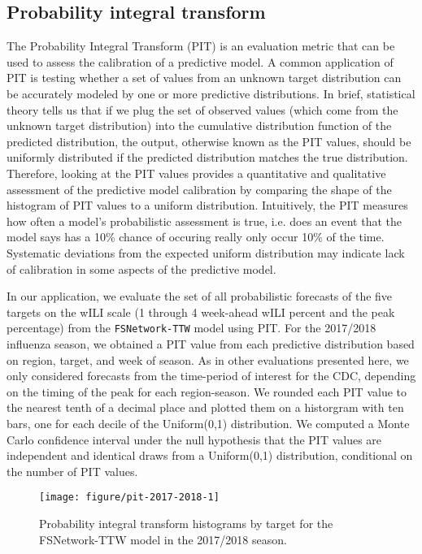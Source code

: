 \documentclass{article}\usepackage[]{graphicx}\usepackage[]{color}
\makeatletter
\def\maxwidth{ %
  \ifdim\Gin@nat@width>\linewidth
    \linewidth
  \else
    \Gin@nat@width
  \fi
}
\newenvironment{knitrout}{}{} %
\makeatother
\begin{document}
\subsection{Probability integral transform}

The Probability Integral Transform (PIT) is an evaluation metric that can be used to assess the calibration of a predictive model.
A common application of PIT is testing whether a set of values from an unknown target distribution can be accurately modeled by one or more predictive distributions. 
In brief, statistical theory tells us that if we plug the set of observed values (which come from the unknown target distribution) into the cumulative distribution function of the predicted distribution, the output, otherwise known as the PIT values, should be uniformly distributed if the predicted distribution matches the true distribution.\cite{angus1994probability,diebold1997evaluating}
Therefore, looking at the PIT values provides a quantitative and qualitative assessment of the predictive model calibration by comparing the shape of the histogram of PIT values to a uniform distribution. 
Intuitively, the PIT measures how often a model's probabilistic assessment is true, i.e. does an event that the model says has a 10\% chance of occuring really only occur 10\% of the time.
Systematic deviations from the expected uniform distribution may indicate lack of calibration in some aspects of the predictive model.

In our application, we evaluate the set of all probabilistic forecasts of the five targets on the wILI scale (1 through 4 week-ahead wILI percent and the peak percentage) from the {\tt FSNetwork-TTW} model using PIT. For the 2017/2018 influenza season, we obtained a PIT value from each predictive distribution based on region, target, and week of season. 
As in other evaluations presented here, we only considered forecasts from the time-period of interest for the CDC, depending on the timing of the peak for each region-season.
We rounded each PIT value to the nearest tenth of a decimal place and plotted them on a historgram with ten bars, one for each decile of the Uniform(0,1) distribution.
We computed a Monte Carlo confidence interval under the null hypothesis that the PIT values are independent and identical draws from a Uniform(0,1) distribution, conditional on the number of PIT values. 

\begin{knitrout}
\color{fgcolor}\begin{figure}
\texttt{[image: figure/pit-2017-2018-1]} \caption[Probability integral transform histograms by target for the FSNetwork-TTW model in the 2017/2018 season]{Probability integral transform histograms by target for the FSNetwork-TTW model in the 2017/2018 season.}\label{fig:pit-2017-2018}
\end{figure}


\end{knitrout}
\end{document}
